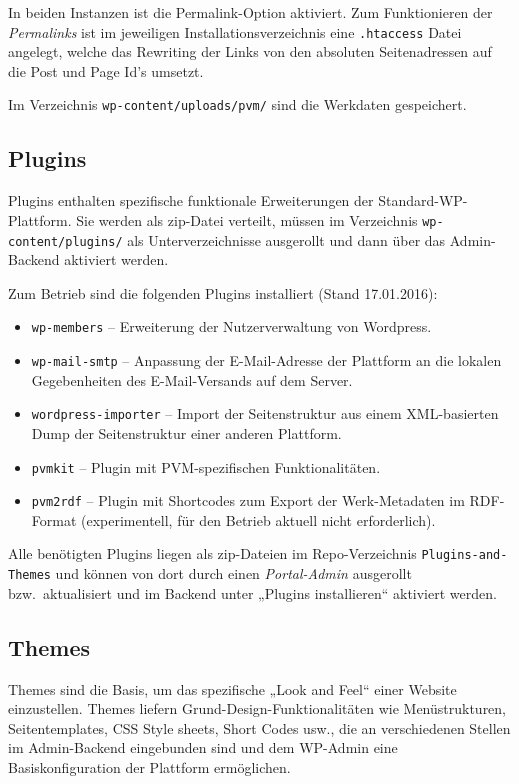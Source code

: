 \documentclass[11pt,a4paper]{article}
\begin{document}
In beiden Instanzen ist die Permalink-Option aktiviert. Zum Funktionieren der
\emph{Permalinks} ist im jeweiligen Installationsverzeichnis eine
\texttt{.htaccess} Datei angelegt, welche das Rewriting der Links von den
absoluten Seitenadressen auf die Post und Page Id's umsetzt.

Im Verzeichnis \texttt{wp-content/uploads/pvm/} sind die Werkdaten
gespeichert. 

\subsection{Plugins}

Plugins enthalten spezifische funktionale Erweiterungen der
Standard-WP-Plattform.  Sie werden als zip-Datei verteilt, müssen im
Verzeichnis \texttt{wp-content/plugins/} als Unterverzeichnisse ausgerollt und
dann über das Admin-Backend aktiviert werden.

Zum Betrieb sind die folgenden Plugins installiert (Stand 17.01.2016): 
\begin{itemize}
\item \texttt{wp-members} -- Erweiterung der Nutzerverwaltung von Wordpress.
\item \texttt{wp-mail-smtp} -- Anpassung der E-Mail-Adresse der Plattform an
  die lokalen Gegebenheiten des E-Mail-Versands auf dem Server.
\item \texttt{wordpress-importer} -- Import der Seitenstruktur aus einem
  XML-basierten Dump der Seitenstruktur einer anderen Plattform.
\item \texttt{pvmkit} -- Plugin mit PVM-spezifischen Funktionalitäten.
\item \texttt{pvm2rdf} -- Plugin mit Shortcodes zum Export der Werk-Metadaten
  im RDF-Format (experimentell, für den Betrieb aktuell nicht erforderlich).
\end{itemize}
Alle benötigten Plugins liegen als zip-Dateien im Repo-Verzeichnis
\texttt{Plugins-and-Themes} und können von dort durch einen
\emph{Portal-Admin} ausgerollt bzw.\ aktualisiert und im Backend unter
„Plugins installieren“ aktiviert werden.

\subsection{Themes}

Themes sind die Basis, um das spezifische „Look and Feel“ einer Website
einzustellen. Themes liefern Grund-Design-Funktionalitäten wie Menüstrukturen,
Seitentemplates, CSS Style sheets, Short Codes usw., die an verschiedenen
Stellen im Admin-Backend eingebunden sind und dem WP-Admin eine
Basiskonfiguration der Plattform ermöglichen.
\end{document}
